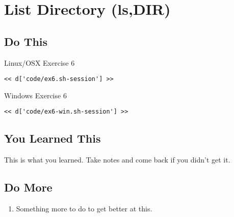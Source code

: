 \chapter{List Directory (ls,DIR)}

\section{Do This}

\begin{code}{Linux/OSX Exercise 6}
\begin{Verbatim}
<< d['code/ex6.sh-session'] >>
\end{Verbatim}
\end{code}

\begin{code}{Windows Exercise 6}
\begin{Verbatim}
<< d['code/ex6-win.sh-session'] >>
\end{Verbatim}
\end{code}

\section{You Learned This}

This is what you learned.  Take notes and come back if you didn't get it.

\section{Do More}

\begin{enumerate}
\item Something more to do to get better at this.
\end{enumerate}

